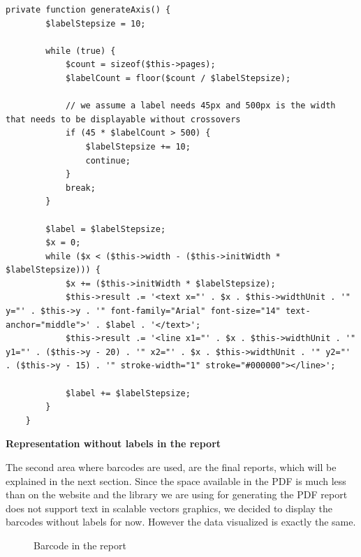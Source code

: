 \begin{lstlisting}[caption=Generating the barcode x axis]
private function generateAxis() {
        $labelStepsize = 10;

        while (true) {
            $count = sizeof($this->pages);
            $labelCount = floor($count / $labelStepsize);

            // we assume a label needs 45px and 500px is the width that needs to be displayable without crossovers
            if (45 * $labelCount > 500) {
                $labelStepsize += 10;
                continue;
            }
            break;
        }

        $label = $labelStepsize;
        $x = 0;
        while ($x < ($this->width - ($this->initWidth * $labelStepsize))) {
            $x += ($this->initWidth * $labelStepsize);
            $this->result .= '<text x="' . $x . $this->widthUnit . '" y="' . $this->y . '" font-family="Arial" font-size="14" text-anchor="middle">' . $label . '</text>';
            $this->result .= '<line x1="' . $x . $this->widthUnit . '" y1="' . ($this->y - 20) . '" x2="' . $x . $this->widthUnit . '" y2="' . ($this->y - 15) . '" stroke-width="1" stroke="#000000"></line>';

            $label += $labelStepsize;
        }
    }
\end{lstlisting}

\textbf{Representation without labels in the report}

The second area where barcodes are used, are the final reports, which will be explained in the next section. Since the space available in the PDF is much less than on the website and the library we are using for generating the PDF report does not support text in scalable vectors graphics, we decided to display the barcodes without labels for now. However the data visualized is exactly the same.

\begin{figure}[!h]
  \centering
  \caption{Barcode in the report}
  \label{fig:feature-barcode-report}
\end{figure}

